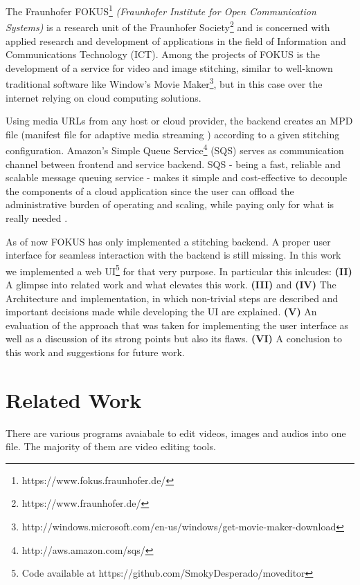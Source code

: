 \documentclass[conference]{IEEEtran}
\begin{document}
The Fraunhofer FOKUS\footnote{https://www.fokus.fraunhofer.de/} \textit{(Fraunhofer Institute for Open Communication Systems)} is a research unit of the Fraunhofer Society\footnote{https://www.fraunhofer.de/} and is concerned with applied research and development of applications in the field of Information and Communications Technology (ICT).
Among the projects of FOKUS is the development of a service for video and image stitching, similar to well-known traditional software like Window's Movie Maker\footnote{http://windows.microsoft.com/en-us/windows/get-movie-maker-download}, but in this case over the internet relying on cloud computing solutions.

Using media URLs from any host or cloud provider, the backend creates an MPD file (manifest file for adaptive media streaming \cite{Sodagar}) according to a given stitching configuration.
Amazon's Simple Queue Service\footnote{http://aws.amazon.com/sqs/} (SQS) serves as communication channel between frontend and service backend.
SQS - being a fast, reliable and scalable message queuing service - makes it simple and cost-effective to decouple the components of a cloud application since the user can offload the administrative burden of operating and scaling, while paying only for what is really needed \cite{VS}.

As of now FOKUS has only implemented a stitching backend. A proper user interface for seamless interaction with the backend is still missing.
In this work we implemented a web UI\footnote{Code available at https://github.com/SmokyDesperado/moveditor} for that very purpose.
In particular this inlcudes:
\textbf{(II)} A glimpse into related work and what elevates this work.
\textbf{(III)} and \textbf{(IV)} The Architecture and implementation, in which non-trivial steps are described and important decisions made while developing the UI are explained.
\textbf{(V)} An evaluation of the approach that was taken for implementing the user interface as well as a discussion of its strong points but also its flaws.
\textbf{(VI)} A conclusion to this work and suggestions for future work.

\section{Related Work}
There are various programs avaiabale to edit videos, images and audios into one file.
The majority of them are video editing tools.
\end{document}
